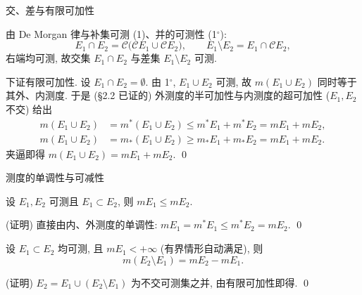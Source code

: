 
\begin{frame}{交、差与有限可加性}

由 De Morgan 律与补集可测 (1)、并的可测性 (1$^\circ$):
\[
E_1 \cap E_2 = \mathscr{C}\big(\mathscr{C}E_1 \cup \mathscr{C}E_2\big), \qquad
E_1 \setminus E_2 = E_1 \cap \mathscr{C}E_2 ,
\]
右端均可测, 故交集 $E_1 \cap E_2$ 与差集 $E_1 \setminus E_2$ 可测.

\pause
\vspace{1em}

下证有限可加性. 设 $E_1 \cap E_2 = \emptyset$. 由 1$^\circ$, $E_1 \cup E_2$ 可测, 故 $m(E_1 \cup E_2)$ 同时等于其外、内测度. 于是 (\S 2.2 已证的) 外测度的\alert{半可加性}与内测度的\alert{超可加性} ($E_1, E_2$ 不交) 给出
\begin{align*}
m(E_1 \cup E_2) &= m^* (E_1 \cup E_2) \leqslant m^* E_1 + m^* E_2 = m E_1 + m E_2, \\
m(E_1 \cup E_2) &= m_* (E_1 \cup E_2) \geqslant m_* E_1 + m_* E_2 = m E_1 + m E_2.
\end{align*}
夹逼即得 $m(E_1 \cup E_2) = m E_1 + m E_2$.
\qed

\end{frame}


\begin{frame}{测度的单调性与可减性}

\begin{thm}[测度的单调性]
设 $E_1, E_2$ 可测且 $E_1 \subset E_2$, 则 $m E_1 \leqslant m E_2$.
\end{thm}

\startproof[bg=yellow, fg=red](证明)
直接由内、外测度的单调性: $m E_1 = m^* E_1 \leqslant m^* E_2 = m E_2$.
\qed

\pause

\begin{cor}[可减性]
设 $E_1 \subset E_2$ 均可测, 且 $m E_1 < +\infty$ (有界情形自动满足), 则
\[
m(E_2 \setminus E_1) = m E_2 - m E_1 .
\]
\end{cor}

\startproof[bg=yellow, fg=red](证明)
$E_2 = E_1 \cup (E_2 \setminus E_1)$ 为\alert{不交}可测集之并, 由有限可加性即得.
\qed



\end{frame}

